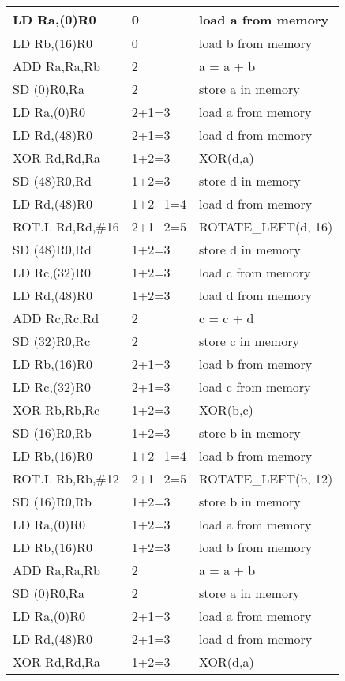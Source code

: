 \begin{enumerate}[wide, label=(B\arabic*)]
\begin{longtable}{|l|l|l|}
LD Ra,(0)R0	&0	& load a from memory  \\ \hline
LD Rb,(16)R0	&0	& load b from memory  \\ \hline
ADD Ra,Ra,Rb	&2	& a = a + b           \\ \hline
SD (0)R0,Ra	&2	& store a in memory   \\ \hline
LD Ra,(0)R0	&2+1=3	& load a from memory  \\ \hline
LD Rd,(48)R0	&2+1=3	& load d from memory  \\ \hline
XOR Rd,Rd,Ra	&1+2=3	& XOR(d,a)            \\ \hline
SD (48)R0,Rd	&1+2=3	& store d in memory   \\ \hline
LD Rd,(48)R0	&1+2+1=4	& load d from memory  \\ \hline
ROT.L Rd,Rd,\#16	&2+1+2=5	& ROTATE\_LEFT(d, 16) \\ \hline
SD (48)R0,Rd	&1+2=3	& store d in memory   \\ \hline
LD Rc,(32)R0	&1+2=3	& load c from memory  \\ \hline
LD Rd,(48)R0	&1+2=3	& load d from memory  \\ \hline
ADD Rc,Rc,Rd	&2	& c = c + d           \\ \hline
SD (32)R0,Rc	&2	& store c in memory   \\ \hline
LD Rb,(16)R0	&2+1=3	& load b from memory  \\ \hline
LD Rc,(32)R0	&2+1=3	& load c from memory  \\ \hline
XOR Rb,Rb,Rc	&1+2=3	& XOR(b,c)            \\ \hline
SD (16)R0,Rb	&1+2=3	& store b in memory   \\ \hline
LD Rb,(16)R0	&1+2+1=4	& load b from memory  \\ \hline
ROT.L Rb,Rb,\#12	&2+1+2=5	& ROTATE\_LEFT(b, 12) \\ \hline
SD (16)R0,Rb	&1+2=3	& store b in memory   \\ \hline
LD Ra,(0)R0	&1+2=3	& load a from memory  \\ \hline
LD Rb,(16)R0	&1+2=3	& load b from memory  \\ \hline
ADD Ra,Ra,Rb	&2	& a = a + b           \\ \hline
SD (0)R0,Ra	&2	& store a in memory   \\ \hline
LD Ra,(0)R0	&2+1=3	& load a from memory  \\ \hline
LD Rd,(48)R0	&2+1=3	& load d from memory  \\ \hline
XOR Rd,Rd,Ra	&1+2=3	& XOR(d,a)            \\ \hline

\end{longtable}
\end{enumerate}

